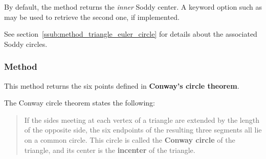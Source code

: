 \medskip

By default, the method returns the \emph{inner} Soddy center. A keyword option such as  may be used to retrieve the second one, if implemented.

\medskip

See  section~\ref{ssub:method_triangle_euler_circle} for details about the associated Soddy circles.

\vspace{1em}

\vspace{1em}
\begin{minipage}{.5\textwidth}
\end{minipage}
\begin{minipage}{.5\textwidth}
\begin{tkzexample}
\end{tkzexample}
\end{minipage}

\subsubsection{Method }
\label{ssub:method_triangle_conway_points}

This method returns the six points defined in \textbf{Conway’s circle theorem}.

\medskip

The Conway circle theorem states the following:

\begin{quote}
If the sides meeting at each vertex of a triangle are extended by the length of the opposite side, the six endpoints of the resulting three segments all lie on a common circle. This circle is called the \textbf{Conway circle} of the triangle, and its center is the \textbf{incenter} of the triangle.
\end{quote}

\medskip

